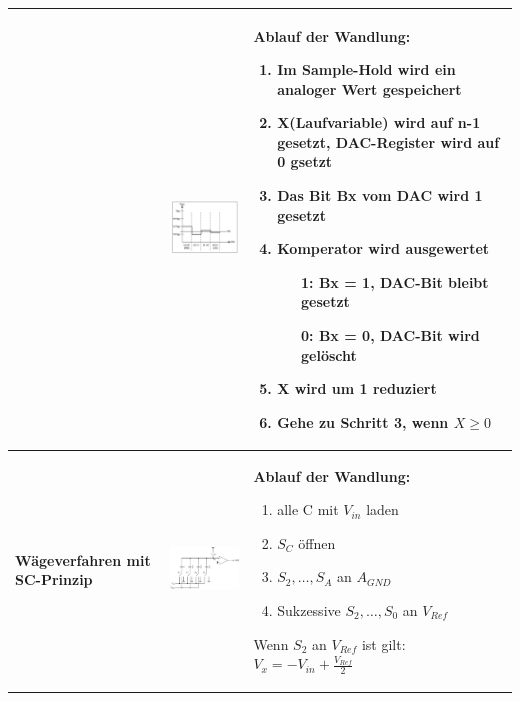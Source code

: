 \begin{longtable}{|>{\bfseries}p{4cm}|p{6cm}|p{8cm}|}
    &
    \includegraphics[width=6cm, valign=t]{pictures/prinzip_SAR.png} &
    \textbf{Ablauf der Wandlung:}
    \begin{enumerate}
      \item Im Sample-Hold wird ein analoger Wert gespeichert
      \item X(Laufvariable) wird auf n-1 gesetzt, DAC-Register wird auf 0 gsetzt
      \item Das Bit Bx vom DAC wird 1 gesetzt
      \item Komperator wird ausgewertet
            \begin{itemize}
              \item[1:] Bx = 1, DAC-Bit bleibt gesetzt
              \item[0:] Bx = 0, DAC-Bit wird gelöscht
            \end{itemize}
      \item X wird um 1 reduziert
      \item Gehe zu Schritt 3, wenn $X \geq 0$ 
    \end{enumerate} \\
  \hline
    Wägeverfahren mit SC-Prinzip &
    \includegraphics[width=6cm, valign=t]{pictures/waegeverfahrenSC} &
    \textbf{Ablauf der Wandlung:}
    \begin{enumerate}
      \item alle C mit $V_{in}$ laden
      \item $S_C$ öffnen
      \item $S_2, \ldots, S_A$ an $A_{GND}$
      \item Sukzessive $S_2, \ldots, S_0$ an $V_{Ref}$
    \end{enumerate}
    Wenn $S_2$ an $V_{Ref}$ ist gilt: $V_x = -V_{in}+\frac{V_{Ref}}{2}$ \\
  \hline
\end{longtable}


